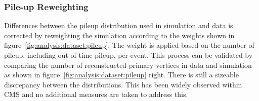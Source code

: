 








% 



\subsubsection{Pile-up Reweighting}
Differences between the pileup distribution used in simulation and data is corrected by reweighting the simulation according to the weights shown in figure~\ref{fig:analysis:dataset:pileup}. The weight is applied based on the number of pileup, including out-of-time pileup, per event.  This process can be validated by comparing the number of reconstructed primary vertices in data and simulation as shown in figure~\ref{fig:analysis:dataset:pileup} right. There is still a sizeable discrepancy between the distributions. This has been widely observed within CMS and no additional measures are taken to address this.


